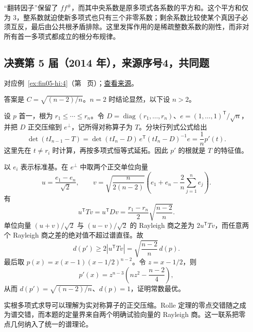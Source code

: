 \documentclass[UTF8,12pt,a4paper,fontset=fandol]{ctexart}
\begin{document}
\begin{remark}[方法与条件]

“翻转因子”保留了 $ff^\#$，而其中央系数是原多项式各系数的平方和。这个平方和仅为 $3$，整系数就迫使新多项式也只有三个非零系数；剩余系数比较使某个真因子必须互反，最后由公共根矛盾排除。这里发挥作用的是稀疏整数系数的刚性，而非对所有首一多项式都成立的根分布规律。

\end{remark}

\subsection{决赛第 5 届（2014 年），来源序号4，共同题}\label{ans:fin05-hi:4}\label{pr:fin05-hi:4}

对应例~\ref{ex:fin05-hi:4}（第~\pageref{ex:fin05-hi:4} 页）；\href{https://github.com/lzxcr/cmc-mathematics/blob/64916fa1fdbc3e444a652eca204d5669058ee321/src/problems/finals/05/04.md}{查看来源}。

\begin{solve}

答案是 $C=\sqrt{(n-2)/n}$。$n=2$ 时结论显然，以下设 $n>2$。

设 $p$ 首一，根为 $r_1\le\cdots\le r_n$。令
$D=\operatorname{diag}(r_1,\ldots,r_n)$、$e=(1,\ldots,1)^{\mathsf T}/\sqrt n$，并把 $D$ 正交压缩到 $e^\perp$，记所得对称算子为 $T$。分块行列式公式给出
\[
\det(tI_{n-1}-T)
=\det(tI_n-D)\,e^{\mathsf T}(tI_n-D)^{-1}e
=\frac1n p'(t).
\]
这里先在 $t\ne r_i$ 时计算，再按多项式恒等式延拓。因此 $p'$ 的根就是 $T$ 的特征值。

以 $e_i$ 表示标准基。在 $e^\perp$ 中取两个正交单位向量
\[
u=\frac{e_1-e_n}{\sqrt2},\qquad
v=\sqrt{\frac{n}{2(n-2)}}
\left(e_1+e_n-\frac2n\sum_{j=1}^n e_j\right).
\]
有
\[
u^{\mathsf T}Tv=u^{\mathsf T}Dv
=\frac{r_1-r_n}{2}\sqrt{\frac{n-2}{n}}.
\]
单位向量 $(u+v)/\sqrt2$ 与 $(u-v)/\sqrt2$ 的 Rayleigh 商之差为 $2u^{\mathsf T}Tv$，而任意两个 Rayleigh 商之差的绝对值不超过谱直径。故
\[
d(p')\ge2|u^{\mathsf T}Tv|=\sqrt{\frac{n-2}{n}}\,d(p).
\]
最后取 $p(x)=x(x-1)(x-1/2)^{n-2}$。令 $z=x-1/2$，则
\[
p'(x)=z^{n-3}\left(nz^2-\frac{n-2}{4}\right),
\]
从而 $d(p')=\sqrt{(n-2)/n}$、$d(p)=1$，证明常数最优。

\end{solve}

\begin{remark}[方法与条件]

实根多项式求导可以理解为实对称算子的正交压缩。Rolle 定理的零点交错随之成为谱交错，而本题的定量界来自两个明确试验向量的 Rayleigh 商。这一联系把零点几何纳入了统一的谱理论。

\end{remark}
\end{document}
